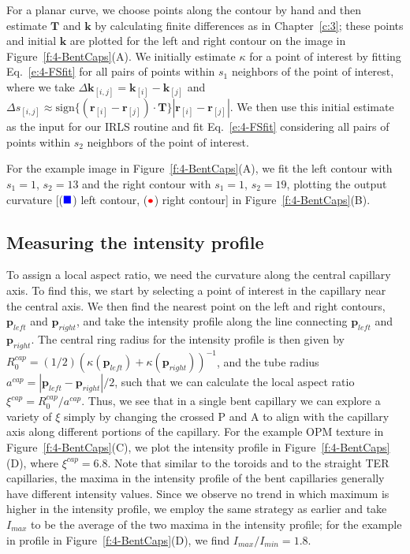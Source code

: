 For a planar curve, we choose points along the contour by hand and then estimate $\mathbf{T}$ and $\mathbf{k}$ by calculating finite differences as in Chapter~\ref{c:3}; these points and initial $\mathbf{k}$ are plotted for the left and right contour on the image in Figure~\ref{f:4-BentCaps}(A).
We initially estimate $\kappa$ for a point of interest by fitting Eq.~\ref{e:4-FSfit} for all pairs of points within $s_1$ neighbors of the point of interest, where we take $\Delta \mathbf{k}_{[i,j]} = \mathbf{k}_{[i]} - \mathbf{k}_{[j]}$ and $\Delta s_{[i,j]} \approx
\textrm{sign}\big \{ (\mathbf{r}_{[i]} - \mathbf{r}_{[j]}) \cdot \mathbf{T}\big \} |\mathbf{r}_{[i]} - \mathbf{r}_{[j]}|$.
We then use this initial estimate as the input for our IRLS routine and fit Eq.~\ref{e:4-FSfit} considering all pairs of points within $s_2$ neighbors of the point of interest.

For the example image in Figure~\ref{f:4-BentCaps}(A), we fit the left contour with $s_1 = 1$, $s_2 = 13$ and the right contour with $s_1 = 1$, $s_2 = 19$, plotting the output curvature [(${\color{blue} \blacksquare}$) left contour, (${\color{red} \bullet}$) right contour] in Figure~\ref{f:4-BentCaps}(B).

\subsection{Measuring the intensity profile}
To assign a local aspect ratio, we need the curvature along the central capillary axis.
To find this, we start by selecting a point of interest in the capillary near the central axis.
We then find the nearest point on the left and right contours, $\mathbf{p}_{left}$ and $\mathbf{p}_{right}$, and take the intensity profile along the line connecting $\mathbf{p}_{left}$ and $\mathbf{p}_{right}$.
The central ring radius for the intensity profile is then given by $R^{cap}_0 = (1/2)(\kappa(\mathbf{p}_{left}) + \kappa(\mathbf{p}_{right}))^{-1}$, and the tube radius $a^{cap} = |\mathbf{p}_{left} - \mathbf{p}_{right}|/2$, such that we can calculate the local aspect ratio $\xi^{cap} = R^{cap}_0/a^{cap}$.
Thus, we see that in a single bent capillary we can explore a variety of $\xi$ simply by changing the crossed P and A to align with the capillary axis along different portions of the capillary.
For the example OPM texture in Figure~\ref{f:4-BentCaps}(C), we plot the intensity profile in Figure~\ref{f:4-BentCaps}(D), where $\xi^{cap} = 6.8$.
Note that similar to the toroids and to the straight TER capillaries, the maxima in the intensity profile of the bent capillaries generally have different intensity values.
Since we observe no trend in which maximum is higher in the intensity profile, we employ the same strategy as earlier and take $I_{max}$ to be the average of the two maxima in the intensity profile; for the example in profile in Figure~\ref{f:4-BentCaps}(D), we find $I_{max}/I_{min} = 1.8$.


